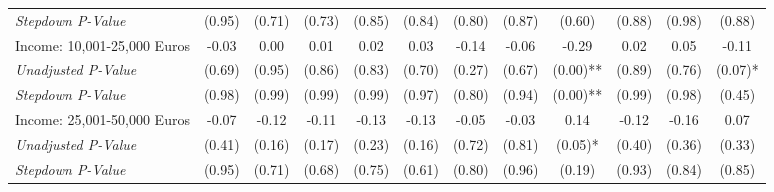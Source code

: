 \begin{tabular}{l c c c c c c c c c c c}
\quad \textit{Stepdown P-Value} & (0.95) & (0.71) & (0.73) & (0.85) & (0.84) & (0.80) & (0.87) & (0.60) & (0.88) & (0.98) & (0.88) \\
Income: 10,001-25,000 Euros & -0.03 & 0.00 & 0.01 & 0.02 & 0.03 & -0.14 & -0.06 & -0.29 & 0.02 & 0.05 & -0.11 \\
\quad \textit{Unadjusted P-Value} & (0.69) & (0.95) & (0.86) & (0.83) & (0.70) & (0.27) & (0.67) & (0.00)** & (0.89) & (0.76) & (0.07)* \\
\quad \textit{Stepdown P-Value} & (0.98) & (0.99) & (0.99) & (0.99) & (0.97) & (0.80) & (0.94) & (0.00)** & (0.99) & (0.98) & (0.45) \\
Income: 25,001-50,000 Euros & -0.07 & -0.12 & -0.11 & -0.13 & -0.13 & -0.05 & -0.03 & 0.14 & -0.12 & -0.16 & 0.07 \\
\quad \textit{Unadjusted P-Value} & (0.41) & (0.16) & (0.17) & (0.23) & (0.16) & (0.72) & (0.81) & (0.05)* & (0.40) & (0.36) & (0.33) \\
\quad \textit{Stepdown P-Value} & (0.95) & (0.71) & (0.68) & (0.75) & (0.61) & (0.80) & (0.96) & (0.19) & (0.93) & (0.84) & (0.85) \\
\bottomrule
\end{tabular}
